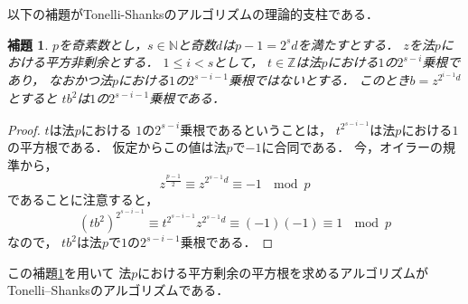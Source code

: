 \documentclass[leqno]{jsarticle}
\newtheorem{lem}[thm]{補題}
\newcommand{\nn}{\mathbb{N}}
\newcommand{\zz}{\mathbb{Z}}
\begin{document}
以下の補題がTonelli-Shanksのアルゴリズムの理論的支柱である．
\begin{lem}\label{lem:hodai}
$p$を奇素数とし，$s\in \nn$と奇数$d$は$p-1=2^{s}d$を満たすとする．
$z$を法$p$における平方非剰余とする．
$ 1\le i< s$として，
$t\in \zz$は法$p$における$1$の$2^{s-i}$乗根であり，
なおかつ法$p$における$1$の$2^{s-i-1}$乗根ではないとする．
このとき$b=z^{2^{i-1}d}$とすると
$tb^2$は$1$の$2^{s-i-1}$乗根である．
\end{lem}
\begin{proof}
$t$は法$p$における
$1$の$2^{s-i}$乗根であるということは，
$t^{2^{s-i-1}}$は法$p$における$1$の平方根である．
仮定からこの値は法$p$で$-1$に合同である．
今，オイラーの規準から，
\[
z^{\frac{p-1}{2}}\equiv z^{2^{s-1}d}\equiv -1\ \mod p
\]
であることに注意すると，
\[
(tb^2)^{2^{s-i-1}}\equiv 
t^{2^{s-i-1}}z^{2^{s-1}d}
\equiv
(-1)(-1)
\equiv 1\ \mod p
\]
なので，
$tb^2$は法$p$で$1$の$2^{s-i-1}$乗根である．
\end{proof}
この補題\ref{lem:hodai}を用いて
法$p$における平方剰余の平方根を求めるアルゴリズムが
Tonelli--Shanksのアルゴリズムである．
\end{document}
